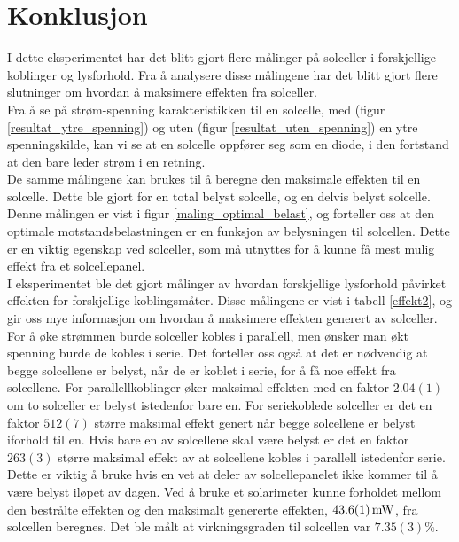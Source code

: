 \documentclass[%
 reprint,
 amsmath,amssymb,
 aps,
 norsk,
 booktabs
]{revtex4-1}
\begin{document}
\section{Konklusjon}
I dette eksperimentet har det blitt gjort flere målinger på solceller i forskjellige koblinger og lysforhold. Fra å analysere disse målingene har det blitt gjort flere slutninger om hvordan å maksimere effekten fra solceller.\\
Fra å se på strøm-spenning karakteristikken til en solcelle,
med (figur \vref{resultat_ytre_spenning}) og uten (figur \vref{resultat_uten_spenning}) en ytre spenningskilde, kan vi se at en solcelle oppfører seg som en diode, i den fortstand at den bare leder strøm i en retning. \\
De samme målingene kan brukes til å beregne den maksimale effekten til en solcelle. Dette ble gjort for en total belyst solcelle, og en delvis belyst solcelle. Denne målingen er vist i figur \vref{maling_optimal_belast}, og forteller oss at den optimale motstandsbelastningen er en funksjon av belysningen til solcellen. Dette er en viktig egenskap ved solceller, som må utnyttes for å kunne få mest mulig effekt fra et solcellepanel.\\
I eksperimentet ble det gjort målinger av hvordan forskjellige lysforhold påvirket effekten for forskjellige koblingsmåter. Disse målingene er vist i tabell \vref{effekt2}, og gir oss mye informasjon om hvordan å maksimere effekten generert av solceller. For å øke strømmen burde solceller kobles i parallell, men ønsker man økt spenning burde de kobles i serie. Det forteller oss også at det er nødvendig at begge solcellene er belyst, når de er koblet i serie, for å få noe effekt fra solcellene. For parallellkoblinger øker maksimal effekten med en faktor $2.04(1)$ om to solceller er belyst istedenfor bare en. For seriekoblede solceller er det en faktor $512(7)$ større maksimal effekt genert når begge solcellene er belyst iforhold til en. Hvis bare en av solcellene skal være belyst er det en faktor $263(3)$ større maksimal effekt av at solcellene kobles i parallell istedenfor serie. Dette er viktig å bruke hvis en vet at deler av solcellepanelet ikke kommer til å være belyst iløpet av dagen. Ved å bruke et solarimeter kunne forholdet mellom den bestrålte effekten og den maksimalt genererte effekten, $\SI{43.6\pm0.1}{\milli\watt}$, fra solcellen beregnes. Det ble målt at virkningsgraden til solcellen var $7.35(3)\%$.\par
\end{document}

